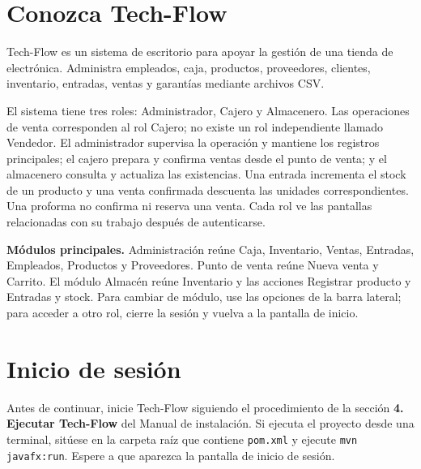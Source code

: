 \documentclass[12pt,a4paper]{article}
\begin{document}
\tableofcontents\listoffigures\newpage

\section{Conozca Tech-Flow}
Tech-Flow es un sistema de escritorio para apoyar la gestión de una tienda de electrónica. Administra empleados, caja, productos, proveedores, clientes, inventario, entradas, ventas y garantías mediante archivos CSV.

El sistema tiene tres roles: Administrador, Cajero y Almacenero. Las operaciones de venta corresponden al rol Cajero; no existe un rol independiente llamado Vendedor. El administrador supervisa la operación y mantiene los registros principales; el cajero prepara y confirma ventas desde el punto de venta; y el almacenero consulta y actualiza las existencias. Una entrada incrementa el stock de un producto y una venta confirmada descuenta las unidades correspondientes. Una proforma no confirma ni reserva una venta. Cada rol ve las pantallas relacionadas con su trabajo después de autenticarse.

\begin{techbox}\textbf{Módulos principales.} Administración reúne Caja, Inventario, Ventas, Entradas, Empleados, Productos y Proveedores. Punto de venta reúne Nueva venta y Carrito. El módulo Almacén reúne Inventario y las acciones Registrar producto y Entradas y stock. Para cambiar de módulo, use las opciones de la barra lateral; para acceder a otro rol, cierre la sesión y vuelva a la pantalla de inicio.\end{techbox}

\section{Inicio de sesión}
Antes de continuar, inicie Tech-Flow siguiendo el procedimiento de la sección \textbf{4. Ejecutar Tech-Flow} del Manual de instalación. Si ejecuta el proyecto desde una terminal, sitúese en la carpeta raíz que contiene \texttt{pom.xml} y ejecute \texttt{mvn javafx:run}. Espere a que aparezca la pantalla de inicio de sesión.
\end{document}
